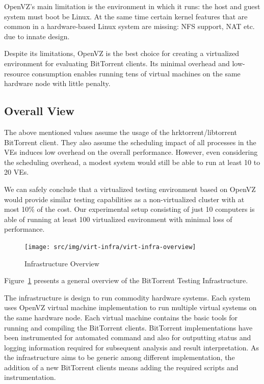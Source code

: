 OpenVZ's main limitation is the environment in which it runs: the host and
guest system must boot be Linux. At the same time certain kernel features that
are common in a hardware-based Linux system are missing: NFS support, NAT etc.
due to innate design.

Despite its limitations, OpenVZ is the best choice for creating a virtualized
environment for evaluating BitTorrent clients. Its minimal overhead and
low-resource consumption enables running tens of virtual machines on the same
hardware node with little penalty.

\subsection{Overall View}
\label{sec:virt-overall}

The above mentioned values assume the usage of the hrktorrent/libtorrent
BitTorrent client. They also assume the scheduling impact of all processes in
the VEs induces low overhead on the overall performance. However, even
considering the scheduling overhead, a modest system would still be able to
run at least 10 to 20 VEs.

We can safely conclude that a virtualized testing environment based on OpenVZ
would provide similar testing capabilities as a non-virtualized cluster with
at most 10\% of the cost. Our  experimental setup consisting of just 10
computers is able of running at least 100 virtualized environment with minimal
loss of performance.

\begin{figure}
  \begin{center}
    \texttt{[image: src/img/virt-infra/virt-infra-overview]}
  \end{center}
  \caption{Infrastructure Overview}
  \label{fig:virt-infra:infrastructure-overview}
\end{figure}

Figure~\ref{fig:virt-infra:infrastructure-overview} presents a general
overview of the BitTorrent Testing Infrastructure.

The infrastructure is design to run commodity hardware systems. Each system
uses OpenVZ virtual machine implementation to run multiple virtual systems on
the same hardware node.  Each virtual machine contains the basic tools for
running and compiling the BitTorrent clients. BitTorrent implementations have
been instrumented for automated command and also for outputting status and
logging information required for subsequent analysis and result
interpretation. As the infrastructure aims to be generic among different
implementation, the addition of a new BitTorrent clients means adding the
required scripts and instrumentation.

